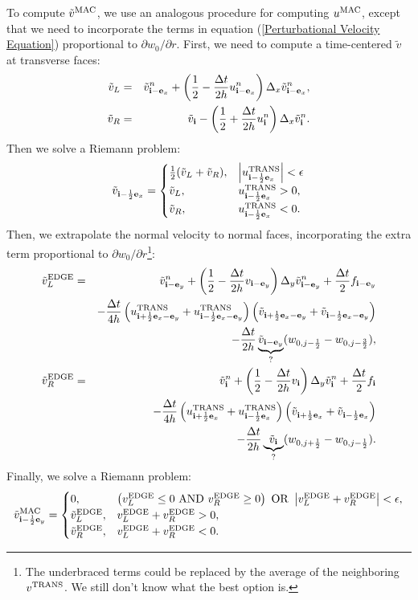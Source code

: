 \documentclass[11pt]{article}
\def\half  {\frac{1}{2}}
\def\dt    {\Delta t}
\def\edge  {\rm EDGE}
\def\mac   {\rm MAC}
\def\trans {\rm TRANS}
\def\eb    {{\bf e}}
\def\ib    {{\bf i}}
\def\vt    {\tilde{v}}
\begin{document}
To compute $\vt^{\mac}$, we use an analogous procedure for computing $u^{\mac}$, except that we need to incorporate the terms in equation (\ref{Perturbational Velocity Equation}) proportional to $\partial w_0/\partial r$.  First, we need to compute a time-centered $\vt$ at transverse faces:
\begin{eqnarray}
\vt_L &=& \vt_{\ib-\eb_x}^n + \left(\half - \frac{\dt}{2h}u_{\ib-\eb_x}^n\right)\Delta_x \vt_{\ib-\eb_x}^n, \\
\vt_R &=& \vt_{\ib} - \left(\half + \frac{\dt}{2h}u_{\ib}^n\right)\Delta_x \vt_{\ib}^n.
\end{eqnarray}
Then we solve a Riemann problem:
\begin{equation}
\vt_{\ib-\half\eb_x} =
\begin{cases}
\half(\vt_L + \vt_R), & \left|u^{\trans}_{\ib-\half\eb_x}\right| < \epsilon \\
\vt_L, & u^{\trans}_{\ib-\half\eb_x} > 0, \\
\vt_R, & u^{\trans}_{\ib-\half\eb_x} < 0. \\
\end{cases}
\end{equation}
Then, we extrapolate the normal velocity to normal faces, incorporating the extra term proportional to $\partial w_0/\partial r$\footnote{The underbraced terms could be replaced by the average of the neighboring $v^{\trans}$.  We still don't know what the best option is.}:
\begin{eqnarray}
\vt_L^{\edge} &=& \vt_{\ib-\eb_y}^n + \left(\half - \frac{\dt}{2h}v_{\ib-\eb_y}\right)\Delta_y \vt_{\ib-\eb_y}^n + \frac{\dt}{2}f_{\ib-\eb_y} \nonumber \\
&& - \frac{\dt}{4h}\left(u_{\ib+\half\eb_x-\eb_y}^{\trans}+u_{\ib-\half\eb_x-\eb_y}^{\trans}\right)\left(\vt_{\ib+\half\eb_x-\eb_y}+\vt_{\ib-\half\eb_x-\eb_y}\right) \nonumber \\
&& - \frac{\dt}{2h}\underbrace{\vt_{\ib-\eb_y}}_{?}(w_{0,j-\half} - w_{0,j-\frac{3}{2}}), \\
\vt_R^{\edge} &=& \vt_{\ib}^n + \left(\half - \frac{\dt}{2h}v_{\ib}\right)\Delta_y \vt_{\ib}^n + \frac{\dt}{2}f_{\ib} \nonumber \\
&& - \frac{\dt}{4h}\left(u_{\ib+\half\eb_x}^{\trans}+u_{\ib-\half\eb_x}^{\trans}\right)\left(\vt_{\ib+\half\eb_x}+\vt_{\ib-\half\eb_x}\right) \nonumber \\
&& - \frac{\dt}{2h}\underbrace{\vt_{\ib}}_{?}(w_{0,j+\half} - w_{0,j-\half}).
\end{eqnarray}
Finally, we solve a Riemann problem:
\begin{equation}
\vt_{\ib-\half\eb_y}^{\mac} =
\begin{cases}
0, & \left(v_L^{\edge} \le 0 ~ {\rm AND} ~ v_R^{\edge} \ge 0\right) ~ {\rm OR} ~ \left|v_L^{\edge} + v_R^{\edge}\right| < \epsilon, \\
\vt_L^{\edge}, & v_L^{\edge} + v_R^{\edge} > 0, \\
\vt_R^{\edge}, & v_L^{\edge} + v_R^{\edge} < 0. 
\end{cases}
\end{equation}
\end{document}
